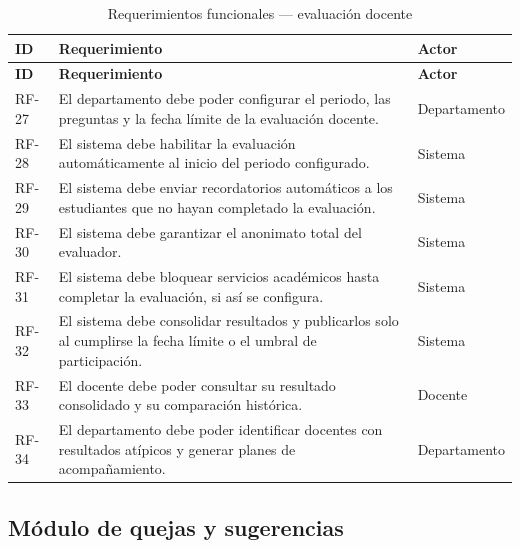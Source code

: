 \begin{longtable}{@{}p{1.5cm} p{6.5cm} p{4.5cm}@{}}
\caption{Requerimientos funcionales --- evaluación docente}
\label{tab:rf-evaluacion}\\
\toprule
\rowcolor{verdeClaro}
\textbf{ID} & \textbf{Requerimiento} & \textbf{Actor} \\
\midrule
\endfirsthead
\toprule
\rowcolor{verdeClaro}
\textbf{ID} & \textbf{Requerimiento} & \textbf{Actor} \\
\midrule
\endhead
RF-27 & El departamento debe poder configurar el periodo, las preguntas y la fecha límite de la evaluación docente. & Departamento \\
RF-28 & El sistema debe habilitar la evaluación automáticamente al inicio del periodo configurado. & Sistema \\
RF-29 & El sistema debe enviar recordatorios automáticos a los estudiantes que no hayan completado la evaluación. & Sistema \\
RF-30 & El sistema debe garantizar el anonimato total del evaluador. & Sistema \\
RF-31 & El sistema debe bloquear servicios académicos hasta completar la evaluación, si así se configura. & Sistema \\
RF-32 & El sistema debe consolidar resultados y publicarlos solo al cumplirse la fecha límite o el umbral de participación. & Sistema \\
RF-33 & El docente debe poder consultar su resultado consolidado y su comparación histórica. & Docente \\
RF-34 & El departamento debe poder identificar docentes con resultados atípicos y generar planes de acompañamiento. & Departamento \\
\bottomrule
\end{longtable}

\subsection{Módulo de quejas y sugerencias}

